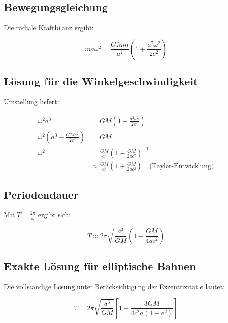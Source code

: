 \subsection*{Bewegungsgleichung}
Die radiale Kraftbilanz ergibt:

\begin{equation}
m a \omega^2 = \frac{GMm}{a^2}\left(1 + \frac{a^2 \omega^2}{2c^2}\right)
\end{equation}

\subsection*{Lösung für die Winkelgeschwindigkeit}
Umstellung liefert:

\begin{align}
\omega^2 a^3 &= GM \left(1 + \frac{a^2 \omega^2}{2c^2}\right) \\
\omega^2 \left(a^3 - \frac{GM a^2}{2c^2}\right) &= GM \\
\omega^2 &= \frac{GM}{a^3} \left(1 - \frac{GM}{2a c^2}\right)^{-1} \\
&\approx \frac{GM}{a^3} \left(1 + \frac{GM}{2a c^2}\right) \quad \text{(Taylor-Entwicklung)}
\end{align}

\subsection*{Periodendauer}
Mit \( T = \frac{2\pi}{\omega} \) ergibt sich:

\begin{equation}
T \approx 2\pi \sqrt{\frac{a^3}{GM}} \left(1 - \frac{GM}{4a c^2}\right)
\end{equation}

\subsection*{Exakte Lösung für elliptische Bahnen}
Die vollständige Lösung unter Berücksichtigung der Exzentrizität \( e \) lautet:

\begin{equation}
\boxed{T = 2\pi \sqrt{\frac{a^3}{GM}} \left[1 - \frac{3GM}{4c^2 a(1-e^2)}\right]}
\end{equation}

